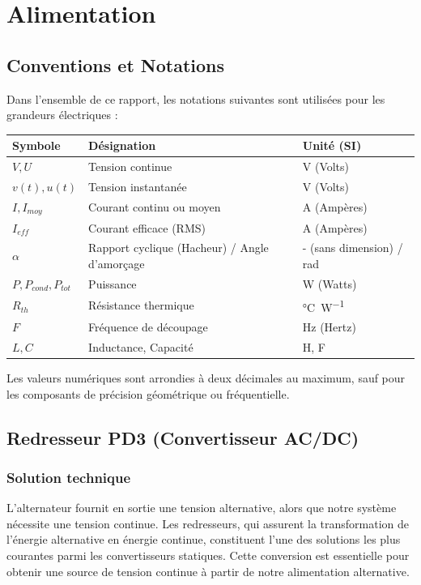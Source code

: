 \chapter{Alimentation}

\section*{Conventions et Notations}
Dans l'ensemble de ce rapport, les notations suivantes sont utilisées pour les grandeurs électriques :
\begin{tableau}[H]
    \small
    \centering
    \begin{tabular}{|l|l|l|}
        \hline
        \textbf{Symbole} & \textbf{Désignation} & \textbf{Unité (SI)} \\
        \hline
        $V, U$ & Tension continue & \si{\volt} (Volts) \\
        \hline
        $v(t), u(t)$ & Tension instantanée & \si{\volt} (Volts) \\
        \hline
        $I, I_{moy}$ & Courant continu ou moyen & \si{\ampere} (Ampères) \\
        \hline
        $I_{eff}$ & Courant efficace (RMS) & \si{\ampere} (Ampères) \\
        \hline
        $\alpha$ & Rapport cyclique (Hacheur) / Angle d'amorçage & - (sans dimension) / \si{\radian} \\
        \hline
        $P, P_{cond}, P_{tot}$ & Puissance & \si{\watt} (Watts) \\
        \hline
        $R_{th}$ & Résistance thermique & \si{\celsius\per\watt} \\
        \hline
        $F$ & Fréquence de découpage & \si{\hertz} (Hertz) \\
        \hline
        $L, C$ & Inductance, Capacité & \si{\henry}, \si{\farad} \\
        \hline
    \end{tabular}
    \caption{Tableau centralisé des notations et unités.}
\end{tableau}
Les valeurs numériques sont arrondies à deux décimales au maximum, sauf pour les composants de précision géométrique ou fréquentielle.

    \section{Redresseur PD3 (Convertisseur AC/DC)}
        \subsection{Solution technique}
        L'alternateur fournit en sortie une tension alternative, alors que notre système nécessite une tension continue. Les redresseurs, qui assurent la transformation de l'énergie alternative en énergie continue, constituent l'une des solutions les plus courantes parmi les convertisseurs statiques. Cette conversion est essentielle pour obtenir une source de tension continue à partir de notre alimentation alternative.

